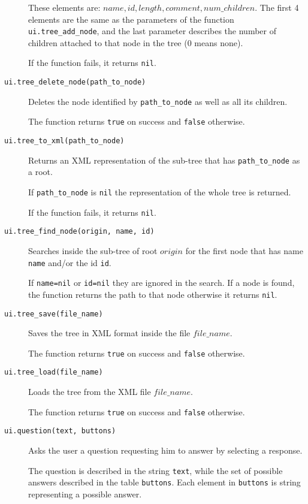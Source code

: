 \documentclass[11pt]{article}
\begin{document}
\begin{description}
{  These elements are: ${name, id, length, comment, num\_children}$. 
  The first 4 elements are the same as the parameters of the function 
  \texttt{ui.tree\_add\_node}, and the last parameter describes the number of 
  children attached to that node in the tree (0 means none).

  If the function fails, it returns \texttt{nil}.
}

\item[\texttt{ui.tree\_delete\_node(path\_to\_node)}]
{
  Deletes the node identified by \texttt{path\_to\_node} as well as all its 
  children.
	  
  The function returns \texttt{true} on success and \texttt{false} otherwise.
}

\item[\texttt{ui.tree\_to\_xml(path\_to\_node)}]
{
  Returns an XML representation of the sub-tree that has \texttt{path\_to\_node} 
  as a root.
	  
  If \texttt{path\_to\_node} is \texttt{nil} the representation of the whole 
  tree is returned.
  
  If the function fails, it returns \texttt{nil}.
}

\item[\texttt{ui.tree\_find\_node(origin, name, id)}]
{
  Searches inside the sub-tree of root $origin$ for the first node that has 
  name \texttt{name} and/or the id \texttt{id}.

  If \texttt{name=nil} or \texttt{id=nil} they are ignored in the search.
  If a node is found, the function returns the path to that node otherwise 
  it returns \texttt{nil}.
}

\item[\texttt{ui.tree\_save(file\_name)}]
{
  Saves the tree in XML format inside the file $file\_name$.

  The function returns \texttt{true} on success and \texttt{false} otherwise.
}

\item[\texttt{ui.tree\_load(file\_name)}]
{
  Loads the tree from the XML file $file\_name$.

  The function returns \texttt{true} on success and \texttt{false} otherwise.
}

\item[\texttt{ui.question(text, buttons)}]
{
  Asks the user a question requesting him to answer by selecting a response.

  The question is described in the string \texttt{text}, while the set of 
  possible answers described in the table \texttt{buttons}. 
  Each element in \texttt{buttons} is string representing a possible answer.
  
}
\end{description}
\end{document}
